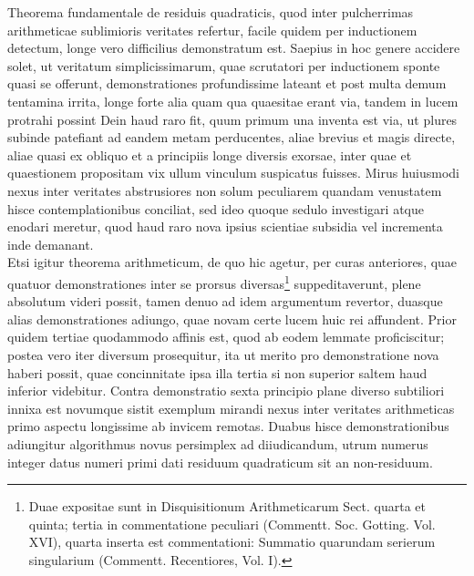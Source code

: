 \documentclass[twoside,12pt, showframe]{memoir}
\begin{document}
Theorema fundamentale de residuis quadraticis, quod inter pulcherrimas arithmeticae sublimioris veritates refertur, facile quidem per inductionem detectum, longe vero difficilius demonstratum est. Saepius in hoc genere accidere solet, ut veritatum simplicissimarum, quae scrutatori per inductionem sponte quasi se offerunt, demonstrationes profundissime lateant et post multa demum tentamina irrita, longe forte alia quam qua quaesitae erant via, tandem in lucem protrahi possint Dein haud raro fit, quum primum una inventa est via, ut plures subinde patefiant ad eandem metam perducentes, aliae brevius et magis directe, aliae quasi ex obliquo et a principiis longe diversis exorsae, inter quae et quaestionem propositam vix ullum vinculum suspicatus fuisses. Mirus huiusmodi nexus inter veritates abstrusiores non solum peculiarem quandam venustatem hisce contemplationibus conciliat, sed ideo quoque sedulo investigari atque enodari meretur, quod haud raro nova ipsius scientiae subsidia vel incrementa inde demanant.\\

Etsi igitur theorema arithmeticum, de quo hic agetur, per curas anteriores, quae quatuor demonstrationes inter se prorsus diversas\footnote{Duae expositae sunt in Disquisitionum Arithmeticarum Sect. quarta et quinta; tertia in commentatione peculiari (Commentt. Soc. Gotting. Vol. XVI), quarta inserta est commentationi: Summatio quarundam serierum singularium (Commentt. Recentiores, Vol. I).} suppeditaverunt, plene\clearpage\noindent%
absolutum videri possit, tamen denuo ad idem argumentum revertor, duasque alias demonstrationes adiungo, quae novam certe lucem huic rei affundent. Prior quidem tertiae quodammodo affinis est, quod ab eodem lemmate proficiscitur; postea vero iter diversum prosequitur, ita ut merito pro demonstratione nova haberi possit, quae concinnitate ipsa illa tertia si non superior saltem haud inferior videbitur. Contra demonstratio sexta principio plane diverso subtiliori innixa est novumque sistit exemplum mirandi nexus inter veritates arithmeticas primo aspectu longissime ab invicem remotas. Duabus hisce demonstrationibus adiungitur algorithmus novus persimplex ad diiudicandum, utrum numerus integer datus numeri primi dati residuum quadraticum sit an non-residuum.\\
\end{document}
